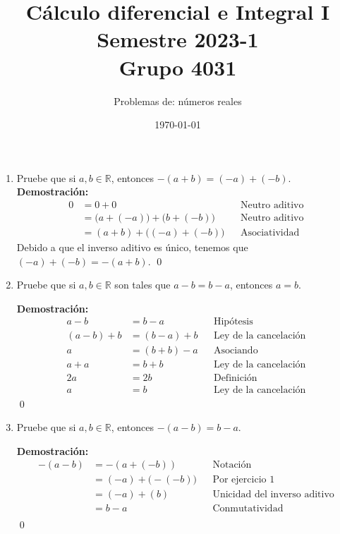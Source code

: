 \documentclass[11pt]{article}
\newcommand{\R}{\mathbb{R}}
\begin{document}
\title{\vspace{-2cm}Cálculo diferencial e Integral I \\ Semestre 2023-1 \\ Grupo 4031}
\author{Problemas de: números reales \\ }
\date{\today}
\maketitle
\thispagestyle{empty}

\begin{enumerate}
\item Pruebe que si $a,b\in \R$, entonces $-(a+b)=(-a)+(-b)$.\\

\textbf{Demostración:} \begin{align*}
  0 &= 0 + 0 && \text{Neutro aditivo} \\
  &= \bigl(a+(-a)\bigr) + \bigl(b + (-b)\bigr) && \text{Neutro aditivo} \\
  &= (a+b) + \bigl((-a)+ (-b)\bigr) && \text{Asociatividad}
\end{align*}
Debido a que el inverso aditivo es único, tenemos que $(-a)+ (-b)=-(a+b)$.
\qed


\item Pruebe que si $a,b\in \R$ son tales que $a-b=b-a$, entonces $a=b$.

\textbf{Demostración:} \begin{align*}
  a-b &= b- a && \text{Hipótesis} \\
  (a-b)+b &= (b-a)+b &&\text{Ley de la cancelación} \\
  a &= (b+b)-a&&\text{Asociando} \\
  a + a &= b+b &&\text{Ley de la cancelación} \\
  2a &= 2b &&\text{Definición} \\
  a &= b && \text{Ley de la cancelación}
\end{align*} \qed

\item Pruebe que si $a,b\in \R$, entonces $-(a-b)=b-a$.

\textbf{Demostración:} \begin{align*}
  -(a-b) &= -(a+(-b)) &&\text{Notación} \\
  &= (-a) + \bigl(-(-b)\bigr) &&\text{Por ejercicio 1} \\
  &= (-a) + (b) &&\text{Unicidad del inverso aditivo} \\
  &= b -a &&\text{Conmutatividad} \\
\end{align*} \qed


\end{enumerate}
\end{document}
